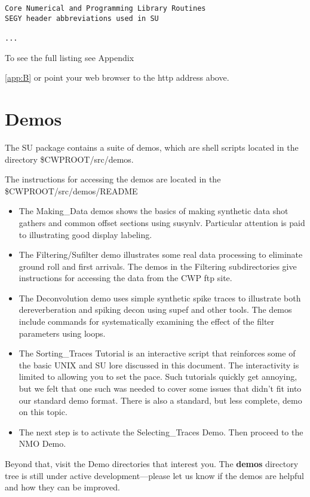{{{\begin{verbatim}
Core Numerical and Programming Library Routines
SEGY header abbreviations used in SU

...
\end{verbatim}}\noindent
To see the full listing see Appendix~{\ref{app:B} or point your
web browser to the http address above.


\section{Demos}
The SU package contains a suite of demos, which are shell scripts
located in the directory \$CWPROOT/src/demos.

The instructions for accessing the demos are located in the
\$CWPROOT/src/demos/README 

\begin{itemize}
\item The Making\_Data demos shows the basics of making synthetic data
shot gathers and common offset sections using susynlv.  Particular
attention is paid to illustrating good display labeling.

\item The Filtering/Sufilter demo illustrates some real data processing to
eliminate ground roll and first arrivals.  The demos in the
Filtering subdirectories give instructions for accessing the data
from the CWP ftp site.

\item The Deconvolution demo uses simple synthetic spike traces to
illustrate both dereverberation and spiking decon using supef and
other tools.  The demos include commands for systematically
examining the effect of the filter parameters using loops.

\item The Sorting\_Traces Tutorial is an interactive script that
reinforces some of the basic UNIX and {\small\sf SU} lore discussed in this
document.  The interactivity is limited to allowing you to set the
pace.  Such tutorials quickly get annoying, but we felt that one
such was needed to cover some issues that didn't fit into our
standard demo format.  There is also a standard, but less complete,
demo on this topic.

\item The next step is to activate the Selecting\_Traces Demo.  Then
proceed to the NMO Demo. 
\end{itemize}
Beyond that, visit the Demo directories
that interest you.  The {\bf demos\/} directory tree is still under
active development---please let us know if the demos are helpful and
how they can be improved.

}}}
